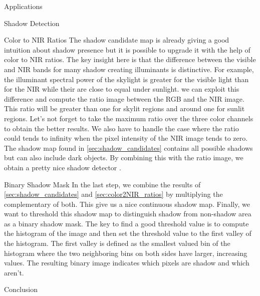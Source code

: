 \documentclass[10pt]{article}
\begin{document}
\begin{section}{Applications}
\begin{subsection}{Shadow Detection}
            \begin{subsubsection}{Color to NIR Ratios}
                \label{sec:color2NIR_ratios}
                The shadow candidate map is already giving a good intuition about shadow presence but it is possible to upgrade it with the help of color to NIR ratios. The key insight here is that the difference between the visible and NIR bands for many shadow creating illuminants is distinctive. For example, the illuminant spectral power of the skylight is greater for the visible light than for the NIR while their are close to equal under sunlight. we can exploit this difference and compute the ratio image between the RGB and the NIR image. This ratio will be greater than one for skylit regions and around one for sunlit regions. Let's not forget to take the maximum ratio over the three color channels to obtain the better results. We also have to handle the case where the ratio could tends to infinity when the pixel intensity of the NIR image tends to zero. The shadow map found in \ref{sec:shadow_candidates} contains all possible shadows but can also include dark objects. By combining this with the ratio image, we obtain a pretty nice shadow detector .
            \end{subsubsection}

            \begin{subsubsection}{Binary Shadow Mask}
                \label{sec:binary_shadow_mask}
                In the last step, we combine the results of \ref{sec:shadow_candidates} and \ref{sec:color2NIR_ratios} by multiplying the complementary of both. This give us a nice continuous shadow map. Finally, we want to threshold this shadow map to distinguish shadow from non-shadow area as a binary shadow mask. The key to find a good threshold value is to compute the histogram of the image and then set the threshold value to the first valley of the histogram. The first valley is defined as the smallest valued bin of the histogram where the two neighboring bins on both sides have larger, increasing values. The resulting binary image indicates which pixels are shadow and which aren't.

            \end{subsubsection}

        \end{subsection}

\end{section}

\begin{section}{Conclusion}
    \label{sec:conclusion}
\end{section}
\end{document}
